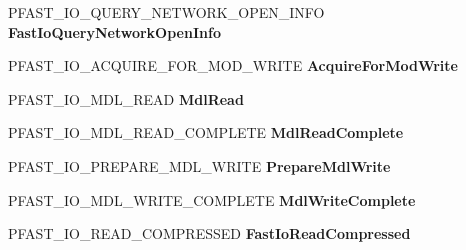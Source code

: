 \begin{DoxyCompactItemize}
\item 
\mbox{\label{struct___f_a_s_t___i_o___d_i_s_p_a_t_c_h_a3f70d63f4981a74ff70c8bdf97a02479}} 
P\+F\+A\+S\+T\+\_\+\+I\+O\+\_\+\+Q\+U\+E\+R\+Y\+\_\+\+N\+E\+T\+W\+O\+R\+K\+\_\+\+O\+P\+E\+N\+\_\+\+I\+N\+FO {\bfseries Fast\+Io\+Query\+Network\+Open\+Info}
\item 
\mbox{\label{struct___f_a_s_t___i_o___d_i_s_p_a_t_c_h_a025eabfe4d2d5afbd0415ff1b04e6b94}} 
P\+F\+A\+S\+T\+\_\+\+I\+O\+\_\+\+A\+C\+Q\+U\+I\+R\+E\+\_\+\+F\+O\+R\+\_\+\+M\+O\+D\+\_\+\+W\+R\+I\+TE {\bfseries Acquire\+For\+Mod\+Write}
\item 
\mbox{\label{struct___f_a_s_t___i_o___d_i_s_p_a_t_c_h_a2a821d71a7ab93eca350ea0bbf3d7c2c}} 
P\+F\+A\+S\+T\+\_\+\+I\+O\+\_\+\+M\+D\+L\+\_\+\+R\+E\+AD {\bfseries Mdl\+Read}
\item 
\mbox{\label{struct___f_a_s_t___i_o___d_i_s_p_a_t_c_h_a2855902c29361a2b9da64142ceff776d}} 
P\+F\+A\+S\+T\+\_\+\+I\+O\+\_\+\+M\+D\+L\+\_\+\+R\+E\+A\+D\+\_\+\+C\+O\+M\+P\+L\+E\+TE {\bfseries Mdl\+Read\+Complete}
\item 
\mbox{\label{struct___f_a_s_t___i_o___d_i_s_p_a_t_c_h_ac0a2393828e5407a98dc400bd7114391}} 
P\+F\+A\+S\+T\+\_\+\+I\+O\+\_\+\+P\+R\+E\+P\+A\+R\+E\+\_\+\+M\+D\+L\+\_\+\+W\+R\+I\+TE {\bfseries Prepare\+Mdl\+Write}
\item 
\mbox{\label{struct___f_a_s_t___i_o___d_i_s_p_a_t_c_h_a6ad770232abeb546435ad51ba5e5bfc0}} 
P\+F\+A\+S\+T\+\_\+\+I\+O\+\_\+\+M\+D\+L\+\_\+\+W\+R\+I\+T\+E\+\_\+\+C\+O\+M\+P\+L\+E\+TE {\bfseries Mdl\+Write\+Complete}
\item 
\mbox{\label{struct___f_a_s_t___i_o___d_i_s_p_a_t_c_h_ab1173fa0f6657e8a983dcebb31a25178}} 
P\+F\+A\+S\+T\+\_\+\+I\+O\+\_\+\+R\+E\+A\+D\+\_\+\+C\+O\+M\+P\+R\+E\+S\+S\+ED {\bfseries Fast\+Io\+Read\+Compressed}
\item 
\mbox{\label{struct___f_a_s_t___i_o___d_i_s_p_a_t_c_h_aa8bec8c1c038d7fe27d1a7c96f6c3fb8}} 

\end{DoxyCompactItemize}

